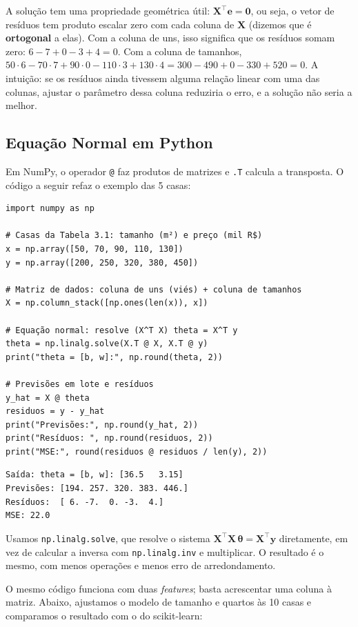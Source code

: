 \documentclass[a4paper,12pt,openany]{book}
\begin{document}
A solução tem uma propriedade geométrica útil: \(\mathbf{X}^\top\mathbf{e} = \mathbf{0}\), ou seja, o vetor de resíduos tem produto escalar zero com cada coluna de \(\mathbf{X}\) (dizemos que é \textbf{ortogonal} a elas). Com a coluna de uns, isso significa que os resíduos somam zero: \(6 - 7 + 0 - 3 + 4 = 0\). Com a coluna de tamanhos, \(50 \cdot 6 - 70 \cdot 7 + 90 \cdot 0 - 110 \cdot 3 + 130 \cdot 4 = 300 - 490 + 0 - 330 + 520 = 0\). A intuição: se os resíduos ainda tivessem alguma relação linear com uma das colunas, ajustar o parâmetro dessa coluna reduziria o erro, e a solução não seria a melhor.

\subsection{Equação Normal em Python}\label{sec:normal_python}

Em NumPy, o operador \texttt{@} faz produtos de matrizes e \texttt{.T} calcula a transposta. O código a seguir refaz o exemplo das 5 casas:

\begin{verbatim}
import numpy as np

# Casas da Tabela 3.1: tamanho (m²) e preço (mil R$)
x = np.array([50, 70, 90, 110, 130])
y = np.array([200, 250, 320, 380, 450])

# Matriz de dados: coluna de uns (viés) + coluna de tamanhos
X = np.column_stack([np.ones(len(x)), x])

# Equação normal: resolve (X^T X) theta = X^T y
theta = np.linalg.solve(X.T @ X, X.T @ y)
print("theta = [b, w]:", np.round(theta, 2))

# Previsões em lote e resíduos
y_hat = X @ theta
residuos = y - y_hat
print("Previsões:", np.round(y_hat, 2))
print("Resíduos: ", np.round(residuos, 2))
print("MSE:", round(residuos @ residuos / len(y), 2))
\end{verbatim}
\begin{verbatim}
Saída: theta = [b, w]: [36.5   3.15]
Previsões: [194. 257. 320. 383. 446.]
Resíduos:  [ 6. -7.  0. -3.  4.]
MSE: 22.0
\end{verbatim}

Usamos \texttt{np.linalg.solve}, que resolve o sistema \(\mathbf{X}^\top\mathbf{X}\,\boldsymbol{\theta} = \mathbf{X}^\top\mathbf{y}\) diretamente, em vez de calcular a inversa com \texttt{np.linalg.inv} e multiplicar. O resultado é o mesmo, com menos operações e menos erro de arredondamento.

O mesmo código funciona com duas \textit{features}; basta acrescentar uma coluna à matriz. Abaixo, ajustamos o modelo de tamanho e quartos às 10 casas e comparamos o resultado com o do scikit-learn:
\end{document}
